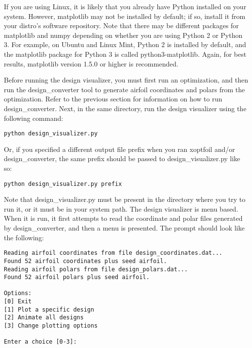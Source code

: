 \documentclass[11pt]{article}
\begin{document}
If you are using Linux, it is likely that you already have Python installed on your
system.  However, matplotlib may not be installed by default; if so, install it from your
distro's software repository.  Note that there may be different packages for matplotlib
and numpy depending on whether you are using Python 2 or Python 3. 
For example, on Ubuntu and Linux Mint, Python 2 is installed by default, and the
matplotlib package for Python 3 is called python3-matplotlib.   Again, for best results,
matplotlib version 1.5.0 or higher is recommended.

Before running the design visualizer, you must first run an optimization, and then run the
design\_converter tool to generate airfoil coordinates and polars from the optimization.
Refer to the previous section for information on how to run design\_converter.  Next, in
the same directory, run the design visualizer using the following command:

\begin{verbatim}
python design_visualizer.py
\end{verbatim}

\noindent Or, if you specified a different output file prefix when you ran xoptfoil and/or
design\_converter, the same prefix should be passed to design\_visualizer.py like so:

\begin{verbatim}
python design_visualizer.py prefix
\end{verbatim}

Note that design\_visualizer.py must be present in the directory where you try to run it,
or it must be in your system path.  The design visualizer is menu based.  When it is run, 
it first attempts to read the coordinate and polar files generated by design\_converter, 
and then a menu is presented. The prompt should look like the following:

\begin{verbatim}
Reading airfoil coordinates from file design_coordinates.dat...
Found 52 airfoil coordinates plus seed airfoil.
Reading airfoil polars from file design_polars.dat...
Found 52 airfoil polars plus seed airfoil.

Options:
[0] Exit
[1] Plot a specific design
[2] Animate all designs
[3] Change plotting options

Enter a choice [0-3]: 
\end{verbatim}
\end{document}
